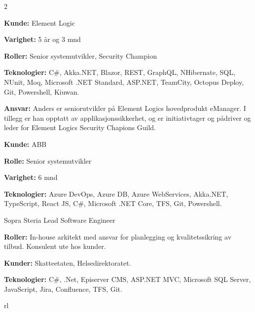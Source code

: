 \documentclass[10pt]{article} %
\begin{document}
\begin{paracol}{2}
{\textbf{Kunde:} Element Logic

\textbf{Varighet:} 5 år og 3 mnd

\textbf{Roller:} Senior systemutvikler, Security Champion

\textbf{Teknologier:} C\#, Akka.NET, Blazor, REST, GraphQL, NHibernate, SQL, NUnit, Moq, Microsoft .NET Standard, ASP.NET, TeamCity, Octopus Deploy, Git, Powershell, Kiuwan.
 
\textbf{Ansvar:} Anders er seniorutvikler på Element Logics hovedprodukt eManager. I tillegg er han opptatt av applikasjonssikkerhet, og er initiativtager og pådriver og leder for Element Logics Security Chapions Guild.
 
\textbf{}
 
\textbf{Kunde:} ABB

\textbf{Rolle:} Senior systemutvikler

\textbf{Varighet:} 6 mnd

\textbf{Teknologier:} Azure DevOps, Azure DB, Azure WebServices, Akka.NET, TypeScript, React JS, C\#, Microsoft .NET Core, TFS, Git, Powershell.
} 

{}
{Sopra Steria} 
{Lead Software Engineer} 
{\textbf{Roller:} In-house arkitekt med ansvar for planlegging og kvalitetssikring av tilbud. Konsulent ute hos kunder.

\textbf{Kunder:} Skatteetaten, Helsedirektoratet.

\textbf{Teknologier:} C\#, .Net, Episerver CMS, ASP.NET MVC, Microsoft SQL Server, JavaScript, Jira, Confluence, TFS, Git.
} 


\begin{supertabular}{rl} %

\end{supertabular}

\vspace{-\baselineskip}\medskip %
\switchcolumn %


\end{paracol}
\end{document}
